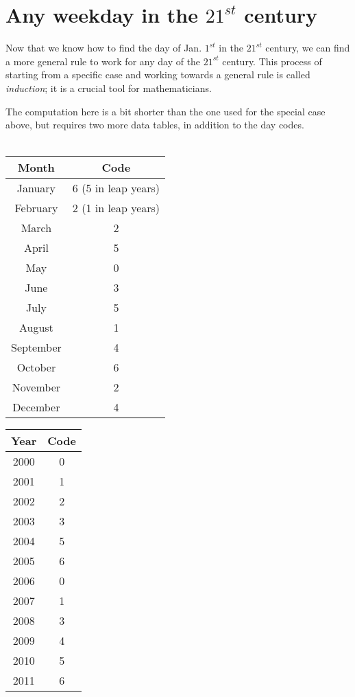 \documentclass{article}
\begin{document}
\newpage

  \section{Any weekday in the $21^{st}$ century}
  Now that we know how to find the day of Jan. $1^{st}$ in the $21^{st}$ century, 
  we can find a more general rule to work for any day of the $21^{st}$ century. 
  This process of starting from a specific case and working towards a general rule 
  is called \emph{induction}; it is a crucial tool for mathematicians.

  The computation here is a bit shorter than the one used for the special case above, 
  but requires two more data tables, in addition to the day codes.\\\\

  \begin{minipage}{0.5\linewidth}
    \centering
    \begin{tabular}{| c | c |}\hline
      Month & Code \\\hline\hline
      January & 6 (5 in leap years) \\\hline
      February & 2 (1 in leap years) \\\hline
      March & 2 \\\hline
      April & 5 \\\hline
      May & 0 \\\hline
      June & 3 \\\hline
      July & 5 \\\hline
      August & 1 \\\hline
      September & 4 \\\hline
      October & 6 \\\hline
      November & 2 \\\hline
      December & 4 \\\hline
    \end{tabular}
  \end{minipage}
  \begin{minipage}{0.5\linewidth}
    \centering
    \begin{tabular}{| c | c |}\hline
      Year & Code \\\hline\hline
      2000 & 0 \\\hline
      2001 & 1 \\\hline
      2002 & 2 \\\hline
      2003 & 3 \\\hline
      2004 & 5 \\\hline
      2005 & 6 \\\hline
      2006 & 0 \\\hline
      2007 & 1 \\\hline
      2008 & 3 \\\hline
      2009 & 4 \\\hline
      2010 & 5 \\\hline
      2011 & 6 \\\hline
    \end{tabular}
  \end{minipage}\\\\
\end{document}
